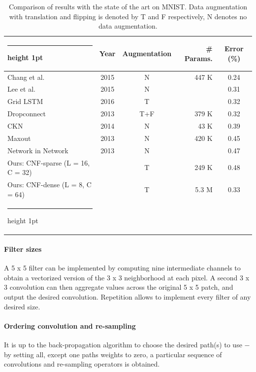 \documentclass[a4paper,twocolumn]{article}
\makeatletter
\newcommand{\thickhline}{%
    \noalign {\ifnum 0=`}\fi \hrule height 1pt
    \futurelet \reserved@a \@xhline
}
\makeatother
\begin{document}
{
\renewcommand{\arraystretch}{1.25}
\begin{table}[ht]
\centering
    \begin{tabular}{l c c r c}
        \thickhline
                                          & Year & Augmentation & \# Params. & Error (\%) \\
        \hline

        Chang et al.                      & 2015 & N            & 447 K      & 0.24 \\
        Lee et al.                        & 2015 & N            &            & 0.31 \\
        Grid LSTM                         & 2016 & T            &            & 0.32 \\
        Dropconnect                       & 2013 & T+F          & 379 K      & 0.32 \\
        CKN                               & 2014 & N            &  43 K      & 0.39 \\
        Maxout                            & 2013 & N            & 420 K      & 0.45 \\
        Network in Network                & 2013 & N            &            & 0.47 \\
        \hline
        Ours: CNF-sparse (L = 16, C = 32) &      & T            & 249 K      & 0.48 \\
        Ours: CNF-dense (L = 8, C = 64)   &      & T            & 5.3 M      & 0.33 \\
        \thickhline
    \end{tabular}
    \caption{Comparison of results with the state of the art on MNIST. Data augmentation with translation and flipping is denoted by T and F respectively, N denotes no data augmentation.}
\end{table}
}

\paragraph{Filter sizes}
A 5 x 5 filter can be implemented by computing nine intermediate channels to obtain a vectorized version of the 3 x 3 neighborhood at each pixel. A second 3 x 3 convolution can then aggregate values across the original 5 x 5 patch, and output the desired convolution. Repetition allows to implement every filter of any desired size.

\paragraph{Ordering convolution and re-sampling}
It is up to the back-propagation algorithm to choose the desired path(s) to use $-$ by setting all, except one paths weights to zero, a particular sequence of convolutions and re-sampling operators is obtained.
\end{document}
